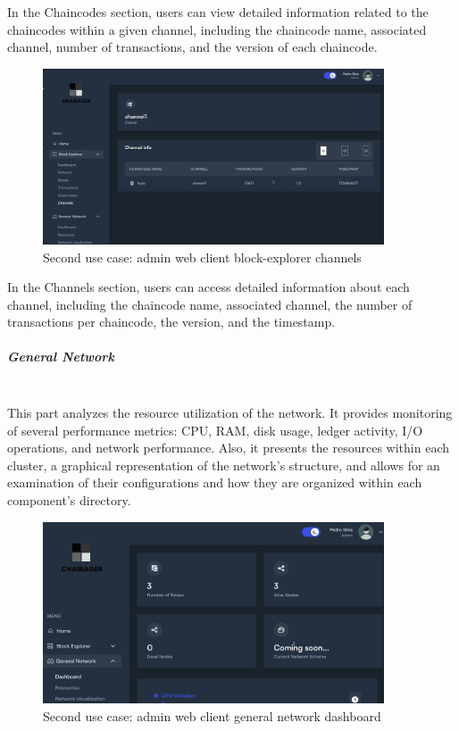 In the Chaincodes section, users can view detailed information related to the chaincodes within a given channel, including the chaincode name, associated channel, number of transactions, and the version of each chaincode.

\begin{figure}[H]
    \centering
    \includegraphics[width=0.9\textwidth]{assets/use-case-2/block-explorer-channels.png} %
    \caption{Second use case: admin web client block-explorer channels}
    \label{fig:sample-image} 
\end{figure}

In the Channels section, users can access detailed information about each channel, including the chaincode name, associated channel, the number of transactions per chaincode, the version, and the timestamp.

\subparagraph{General Network}\mbox{}\\
This part analyzes the resource utilization of the network. It provides monitoring of several performance metrics: CPU, RAM, disk usage, ledger activity, I/O operations, and network performance. Also, it presents the resources within each cluster, a graphical representation of the network's structure, and allows for an examination of their configurations and how they are organized within each component's directory.

\begin{figure}[H]
    \centering
    \includegraphics[width=0.9\textwidth]{assets/use-case-2/general-network-dashboard.png} %
    \caption{Second use case: admin web client general network dashboard}
    \label{fig:sample-image} 
\end{figure}

